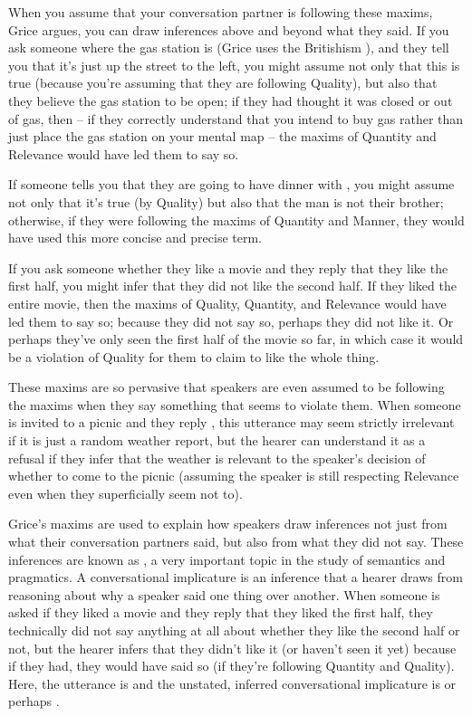 When you assume that your conversation partner is following these maxims, Grice argues, you can draw inferences above and beyond what they said.  If you ask someone where the gas station is (Grice uses the Britishism ), and they tell you that it's just up the street to the left, you might assume not only that this is true (because you're assuming that they are following Quality), but also that they believe the gas station to be open; if they had thought it was closed or out of gas, then -- if they correctly understand that you intend to buy gas rather than just place the gas station on your mental map -- the maxims of Quantity and Relevance would have led them to say so.  

If someone tells you that they are going to have dinner with , you might assume not only that it's true (by Quality) but also that the man is not their brother; otherwise, if they were following the maxims of Quantity and Manner, they would have used this more concise and precise term.

If you ask someone whether they like a movie and they reply that they like the first half, you might infer that they did not like the second half.   If they  liked the entire movie, then the maxims of Quality, Quantity, and Relevance would have led them to say so; because they did not say so, perhaps they did not like it.  Or perhaps they've only seen the first half of the movie so far, in which case it would be a violation of Quality for them to claim to like the whole thing.

These maxims are so pervasive that speakers are even assumed to be following the maxims when they say something that seems to violate them.   When someone is invited to a picnic and they reply , this utterance may seem strictly 
irrelevant if it is just a random weather report, but the hearer can understand it as a refusal if they infer that the weather is relevant to the speaker's decision of whether to come to the picnic (assuming the speaker is still respecting Relevance even when they superficially seem not to).


Grice's maxims are used to explain how speakers draw inferences not just from what their conversation partners said, but also from  what they did not say.  These inferences are known as , a very important topic in the study of semantics and pragmatics.  A conversational implicature is an inference that a hearer draws from reasoning about why a speaker said one thing over another.  When someone is asked if they liked a movie and they reply that they liked the first half, they technically did not say anything at all about whether they like the second half or not, but the hearer infers that they didn't like it (or haven't seen it yet) because if they had, they would have said so (if they're following Quantity and Quality).  Here, the utterance is  and the unstated, inferred conversational implicature is  or perhaps .  

